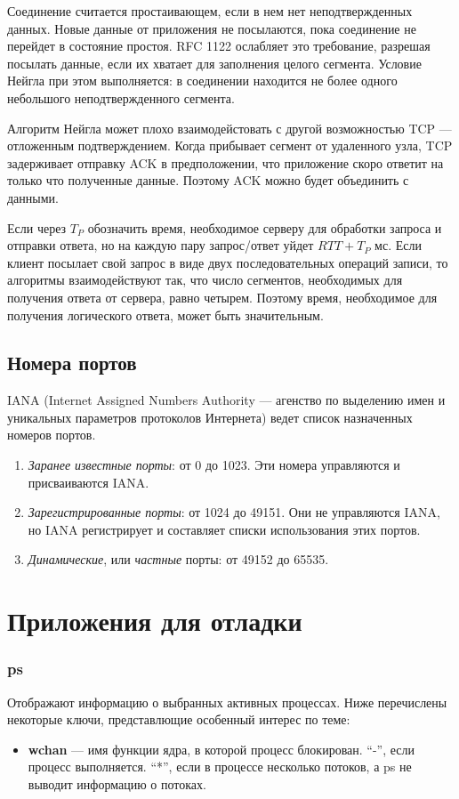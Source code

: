 Соединение считается простаивающем, если в нем нет неподтвержденных данных. Новые данные от приложения не посылаются, пока соединение не перейдет в состояние простоя. RFC 1122 ослабляет это требование, разрешая посылать данные, если их хватает для заполнения целого сегмента. Условие Нейгла при этом выполняется: в соединении находится не более одного небольшого неподтвержденного сегмента.

Алгоритм Нейгла может плохо взаимодейстовать с другой возможностью TCP --- отложенным подтверждением. Когда прибывает сегмент от удаленного узла, TCP задерживает отправку ACK в предположении, что приложение скоро ответит на только что полученные данные. Поэтому ACK можно будет объединить с данными.

Если через $T_P$ обозначить время, необходимое серверу для обработки запроса и отправки ответа, но на каждую пару запрос/ответ уйдет $RTT + T_P$ мс. Если клиент посылает свой запрос в виде двух последовательных операций записи, то алгоритмы взаимодействуют так, что число сегментов, необходимых для получения ответа от сервера, равно четырем. Поэтому время, необходимое для получения логического ответа, может быть значительным.

\subsection{Номера портов}
IANA (Internet Assigned Numbers Authority --- агенство по выделению имен и уникальных параметров протоколов Интернета) ведет список назначенных номеров портов.
\begin{enumerate}
  \item \emph{Заранее известные порты}: от 0 до 1023. Эти номера управляются и присваиваются IANA.
  \item \emph{Зарегистрированные порты}: от 1024 до 49151. Они не управляются IANA, но IANA регистрирует и составляет списки использования этих портов.
  \item \emph{Динамические}, или \emph{частные} порты: от 49152 до 65535.
\end{enumerate}

\section{Приложения для отладки}
\subsubsection{ps}
Отображают информацию о выбранных активных процессах. Ниже перечислены некоторые ключи, представлющие особенный интерес по теме:
\begin{itemize}
  \item \textbf{wchan} --- имя функции ядра, в которой процесс блокирован. ``-'', если процесс выполняется. ``*'', если в процессе несколько потоков, а ps не выводит информацию о потоках.
\end{itemize}

